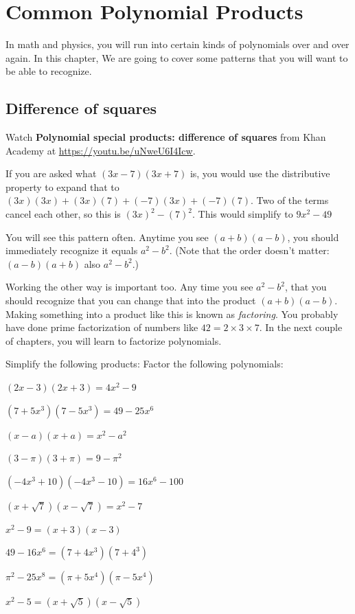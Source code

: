 \chapter{Common Polynomial Products}

In math and physics, you will run into certain kinds of polynomials
over and over again. In this chapter, We are going to cover some
patterns that you will want to be able to recognize.

\section{Difference of squares}

Watch \textbf{Polynomial special products: difference of squares} from Khan Academy at \url{https://youtu.be/uNweU6I4Icw}.

If you are asked what $(3x - 7)(3x + 7)$ is, you would use the
distributive property to expand that to $(3x)(3x) + (3x)(7) + (-7)(3x) + (-7)(7)$.
Two of the terms cancel each other, so this is $(3x)^2 - (7)^2$. This would simplify to $9x^2 - 49$

You will see this pattern often. Anytime you see $(a + b)(a - b)$, you should immediately
recognize it equals $a^2 - b^2$. (Note that the order doesn't matter: $(a - b)(a + b)$ also $a^2 - b^2$.)

Working the other way is important too. Any time you see $a^2 - b^2$,
that you should recognize that you can change that into the product
$(a + b)(a - b)$. Making something into a product like this is known as
\emph{factoring}. You probably have done prime factorization of
numbers like $42 = 2 \times 3 \times 7$. In the next couple of
chapters, you will learn to factorize polynomials.

\begin{Exercise}[title={Difference of Squares}, label=diffsquares]
  Simplify the following products:
  Factor the following polynomials:
\end{Exercise}
\begin{Answer}[ref=diffsquares]
  $(2x - 3)(2x + 3) = 4x^2 - 9$
  
  $(7 + 5x^3)(7 - 5x^3) = 49 - 25x^6$
  
  $(x - a)(x + a) = x^2 - a^2$
  
  $(3 - \pi)(3 + \pi) = 9 - \pi^2$
  
  $(-4x^3 + 10)(-4x^3 - 10) = 16x^6 - 100$
  
  $(x + \sqrt{7})(x - \sqrt{7}) = x^2 - 7$

  $x^2 - 9 = (x + 3)(x - 3)$

  $49 - 16x^6 = (7 + 4x^3)(7 + 4^3)$
  
  $\pi^2 - 25x^8 = (\pi + 5x^4)(\pi - 5x^4)$
  
  $x^2 - 5 = (x + \sqrt{5})(x - \sqrt{5})$

\end{Answer}

